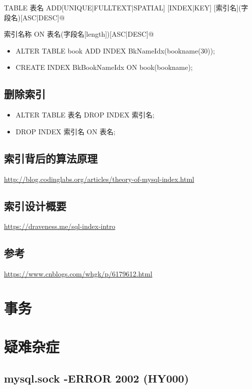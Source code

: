 \documentclass[UTF8,a4paper,12pt]{ctexbook}
\begin{document}
		\verb@ALTER TABLE 表名 ADD[UNIQUE|FULLTEXT|SPATIAL] [INDEX|KEY] [索引名](字段名)[ASC|DESC]@
		
		 索引名称 ON 表名(字段名[length])[ASC|DESC]@
		
		\begin{itemize}
			\item ALTER TABLE book ADD INDEX BkNameIdx(bookname(30));
			\item CREATE INDEX BkBookNameIdx ON book(bookname);
		\end{itemize}
	
	\section{删除索引}
		\begin{itemize}
			\item ALTER TABLE 表名 DROP INDEX 索引名;
			\item DROP INDEX 索引名 ON 表名;
		\end{itemize}
	
	\section{索引背后的算法原理}
		\url{http://blog.codinglabs.org/articles/theory-of-mysql-index.html}	
	
	
	\section{索引设计概要}
		\url{https://draveness.me/sql-index-intro}
			
	\section{参考}
		\url{https://www.cnblogs.com/whgk/p/6179612.html}
			
	
	
\chapter{事务}



\chapter{疑难杂症}
	\section{mysql.sock -ERROR 2002 (HY000)}
		
\end{document}

